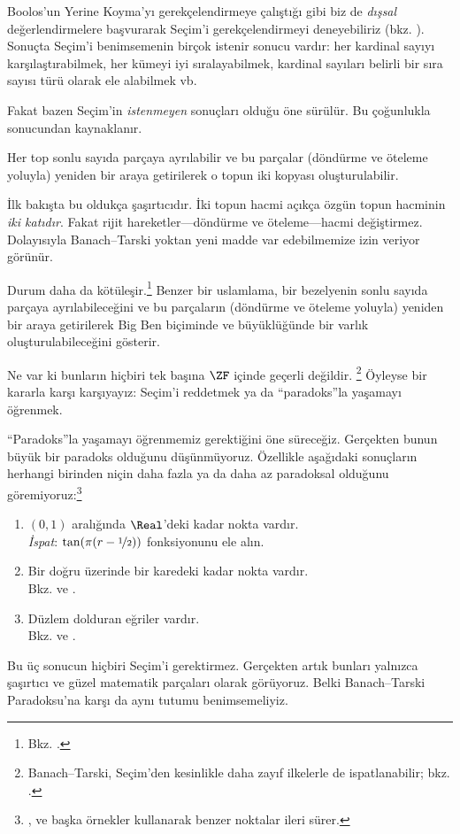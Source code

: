 \documentclass[../../../include/open-logic-section]{subfiles}
\begin{document}

Boolos'un Yerine Koyma'yı gerekçelendirmeye çalıştığı gibi biz de
\emph{dışsal} değerlendirmelere başvurarak Seçim'i gerekçelendirmeyi
deneyebiliriz (bkz. ). Sonuçta Seçim'i
benimsemenin birçok istenir sonucu vardır: her kardinal sayıyı
karşılaştırabilmek, her kümeyi iyi sıralayabilmek, kardinal sayıları belirli
bir sıra sayısı türü olarak ele alabilmek vb.

Fakat bazen Seçim'in \emph{istenmeyen} sonuçları olduğu öne sürülür.
Bu çoğunlukla \cite{BanachTarski1924} sonucundan kaynaklanır.

\begin{thm}
Her top sonlu sayıda parçaya ayrılabilir ve bu parçalar (döndürme ve
öteleme yoluyla) yeniden bir araya getirilerek o topun iki kopyası
oluşturulabilir.
\end{thm}
\noindent
İlk bakışta bu oldukça şaşırtıcıdır. İki topun hacmi açıkça özgün topun
hacminin \emph{iki katıdır}. Fakat rijit hareketler---döndürme ve
öteleme---hacmi değiştirmez. Dolayısıyla Banach--Tarski yoktan yeni madde
var edebilmemize izin veriyor görünür.

Durum daha da kötüleşir.\footnote{Bkz.
\citet[Theorem 3.12]{Wagon2016}.} Benzer bir uslamlama, bir bezelyenin sonlu
sayıda parçaya ayrılabileceğini ve bu parçaların (döndürme ve öteleme
yoluyla) yeniden bir araya getirilerek Big Ben biçiminde ve büyüklüğünde
bir varlık oluşturulabileceğini gösterir.

Ne var ki bunların hiçbiri tek başına $\ZF$ içinde geçerli değildir.
\footnote{Banach--Tarski, Seçim'den kesinlikle daha zayıf ilkelerle de
ispatlanabilir; bkz. \citet[303]{Wagon2016}.} Öyleyse bir kararla karşı
karşıyayız: Seçim'i reddetmek ya da ``paradoks''la yaşamayı öğrenmek.

``Paradoks''la yaşamayı öğrenmemiz gerektiğini öne süreceğiz. Gerçekten
bunun büyük bir paradoks olduğunu düşünmüyoruz. Özellikle aşağıdaki
sonuçların herhangi birinden niçin daha fazla ya da daha az paradoksal
olduğunu göremiyoruz:\footnote{\citet[276--7]{Potter2004},
\citet[16]{Weston2003} ve \citet[31, 308--9]{Wagon2016} başka örnekler
kullanarak benzer noktalar ileri sürer.}
\begin{enumerate}
	\item $(0,1)$ aralığında $\Real$'deki kadar nokta vardır.
	\\\emph{İspat}: $\tan(\pi(r-\nicefrac{1}{2}))$ fonksiyonunu ele alın.
	\item Bir doğru üzerinde bir karedeki kadar nokta vardır.
	\\Bkz.  ve
	.
	\item Düzlem dolduran eğriler vardır.
	\\Bkz.  ve
	.
\end{enumerate}
Bu üç sonucun hiçbiri Seçim'i gerektirmez. Gerçekten artık bunları yalnızca
şaşırtıcı ve güzel matematik parçaları olarak görüyoruz. Belki
Banach--Tarski Paradoksu'na karşı da aynı tutumu benimsemeliyiz.
\end{document}
